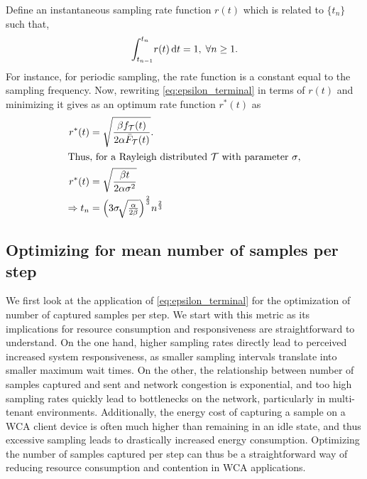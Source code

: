 Define an instantaneous sampling rate function $r(t)$ which is related to $\{t_n\}$ such that,
\begin{alignat}{1}
{\int_{t_{n-1}}^{t_n}}r(t)\,\mathrm{d} t=1,\;\forall n\geq1.\label{rt}
\end{alignat}
For instance, for periodic sampling, the rate function is a constant equal to the sampling frequency. 
Now, rewriting \cref{eq:epsilon_terminal} in terms of $r(t)$ and minimizing it gives as an optimum rate function $r^*(t)$ as
\begin{alignat}{1}
r^*(t)&=\sqrt{\dfrac{\beta f_\mathcal{T}(t)}{2\alpha\bar{F}_\mathcal{T}(t)}}.\nonumber\\
\intertext{Thus, for a Rayleigh distributed $\mathcal{T}$ with parameter $\sigma$,}
r^*(t)&=\sqrt{\dfrac{\beta t}{2\alpha\sigma^2}}\nonumber\\
\Rightarrow t_n&=\Big(3\sigma\!\sqrt{\tfrac{\alpha}{2\beta}}\Big)^{\frac{2}{3}}n^{\frac{2}{3}}\label{tn_approx_rayleigh}
\end{alignat}


\subsection{Optimizing for mean number of samples per step}

We first look at the application of \cref{eq:epsilon_terminal} for the optimization of number of captured samples per step.
We start with this metric as its implications for resource consumption and responsiveness are straightforward to understand.
On the one hand, higher sampling rates directly lead to perceived increased system responsiveness, as smaller sampling intervals translate into smaller maximum wait times.
On the other, the relationship between number of samples captured and sent and network congestion is exponential, and too high sampling rates quickly lead to bottlenecks on the network, particularly in multi-tenant environments.
Additionally, the energy cost of capturing a sample on a \ac{WCA} client device is often much higher than remaining in an idle state, and thus excessive sampling leads to drastically increased energy consumption.
Optimizing the number of samples captured per step can thus be a straightforward way of reducing resource consumption and contention in \ac{WCA} applications.

